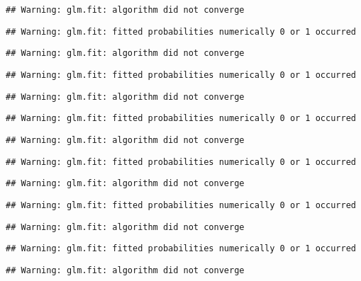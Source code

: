 \documentclass[
]{article}
\begin{document}
\begin{verbatim}
## Warning: glm.fit: algorithm did not converge
\end{verbatim}

\begin{verbatim}
## Warning: glm.fit: fitted probabilities numerically 0 or 1 occurred
\end{verbatim}

\begin{verbatim}
## Warning: glm.fit: algorithm did not converge
\end{verbatim}

\begin{verbatim}
## Warning: glm.fit: fitted probabilities numerically 0 or 1 occurred
\end{verbatim}

\begin{verbatim}
## Warning: glm.fit: algorithm did not converge
\end{verbatim}

\begin{verbatim}
## Warning: glm.fit: fitted probabilities numerically 0 or 1 occurred
\end{verbatim}

\begin{verbatim}
## Warning: glm.fit: algorithm did not converge
\end{verbatim}

\begin{verbatim}
## Warning: glm.fit: fitted probabilities numerically 0 or 1 occurred
\end{verbatim}

\begin{verbatim}
## Warning: glm.fit: algorithm did not converge
\end{verbatim}

\begin{verbatim}
## Warning: glm.fit: fitted probabilities numerically 0 or 1 occurred
\end{verbatim}

\begin{verbatim}
## Warning: glm.fit: algorithm did not converge
\end{verbatim}

\begin{verbatim}
## Warning: glm.fit: fitted probabilities numerically 0 or 1 occurred
\end{verbatim}

\begin{verbatim}
## Warning: glm.fit: algorithm did not converge
\end{verbatim}
\end{document}
